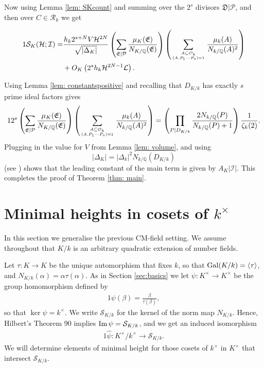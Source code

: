 \documentclass[11pt]{amsart}
\numberwithin{equation}{eqncounter}
\def\IQ{\mathbb Q}
\def\Pc{\mathcal{P}}
\def\IL{\mathcal{L}}
\def\H{\mathcal{H}}
\def\I{\mathcal{I}}
\def\R{\mathcal{R}}
\newcommand{\Norm}{N_{K/k}}
\def\D{\mathfrak{D}}
\def\E{\mathfrak{E}}
\def\NKk{\mathcal{S}_{K/k}}
\def\Gal{\mathop{\rm Gal}\nolimits}
\def\IM{\mathop{\rm Im}\nolimits}
\def\Oseen{{\mathcal{O}}}
\def\Sc{\mathcal{S}}
\def\dis{D_{K/k}}
\def\conSK{A_K}
\def\Gal{\mathop{{\rm Gal}}\nolimits}
\begin{document}
Now using Lemma \ref{lem: SKcount} and summing over the $2^s$ divisors  $\D|\Pc$, and then over $C\in \R_k$ we get


\begin{alignat*}1
\Sc_K(\H; \I)=&\frac{h_k 2^{s+N} V\H^{2N}}{\sqrt{|\Delta_K|}} 
\left(\sum_{\E|\Pc}\frac{\mu_K(\E)}{N_{K/\IQ}(\E)}\right)
\left(\sum_{A\subseteq \Oseen_k \atop (A,P_1\cdots P_s)=1}\frac{\mu_k(A)}{N_{k/\IQ}(A)^2}\right)\\
&+O_{K}\left(2^sh_k\H^{2N-1}\IL\right).
\end{alignat*}

Using Lemma \ref{lem: constantspositive} and recalling that $\dis$ has exactly $s$ prime ideal
factors gives
\begin{alignat*}1
2^{s} \left(\sum_{\E|\Pc}\frac{\mu_K(\E)}{N_{K/\IQ}(\E)}\right)
\left(\sum_{A\subseteq \Oseen_k \atop (A,P_1\cdots P_s)=1}\frac{\mu_k(A)}{N_{k/\IQ}(A)^2}\right)
=\left(\prod_{P|\dis}\frac{2N_{k/\IQ}(P)}{N_{k/\IQ}(P)+1}\right)\frac{1}{\zeta_k(2)}.
\end{alignat*}
Plugging in the value for $V$ from Lemma \ref{lem: volume}, and using 
$$|\Delta_K|=|\Delta_k|^2N_{k/\IQ}(\dis)$$ 
(see \cite[p.24]{13}) shows that the leading constant of the main term is given by $\conSK|\I|$.
This completes the proof of Theorem \ref{thm: main}.









\section{Minimal heights in cosets of $k^\times$}
In this section we generalise the previous CM-field setting. We assume throughout that $K/k$
is an arbitrary quadratic extension of number fields.

Let $\tau: K\to K$ be the unique automorphism
that fixes $k$, so that $\Gal(K/k)=\langle \tau\rangle$, and $\Norm(\alpha)=\alpha\tau(\alpha)$.
As in Section \ref{sec:basics} we let
$\psi:K^\times\to K^\times$ be the group homomorphism defined by  
\begin{alignat*}1%
\psi(\beta)=\frac{\beta}{\tau(\beta)},
\end{alignat*}
so that $\ker \psi=k^\times$. We write $\NKk$ for the kernel of the norm map $\Norm$.
Hence,  Hilbert's Theorem 90 implies $\IM \psi=\NKk$, and we get an induced isomorphism
\begin{alignat}1\label{map:isom}
\hat{\psi}: K^\times/k^\times \to \NKk.
\end{alignat}
We will determine elements of minimal height for those cosets of $k^\times$ in $K^\times$
that intersect $\NKk$. 
\end{document}
